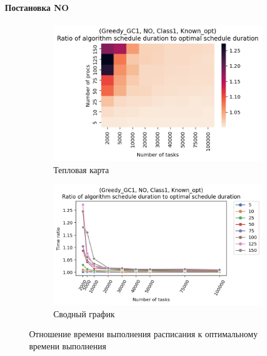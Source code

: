 \paragraph{Постановка NO}

\begin{figure}[!htbp]
    \centering
    \begin{subfigure}{0.49\textwidth}
        \includegraphics[width=\textwidth]{imgs/ideal_1/NO/th.png}
        \caption{Тепловая карта}   
        \label{fig:NO-GC1-times-heatmap}
    \end{subfigure}
    \hfill
    \begin{subfigure}{0.49\textwidth}
        \includegraphics[width=\textwidth]{imgs/ideal_1/NO/gr_amalgamated.png}
        \caption{Сводный график}   
        \label{fig:NO-GC1-times-compiled} 
    \end{subfigure}
    \caption{Отношение времени выполнения расписания к оптимальному времени выполнения}
\end{figure}

